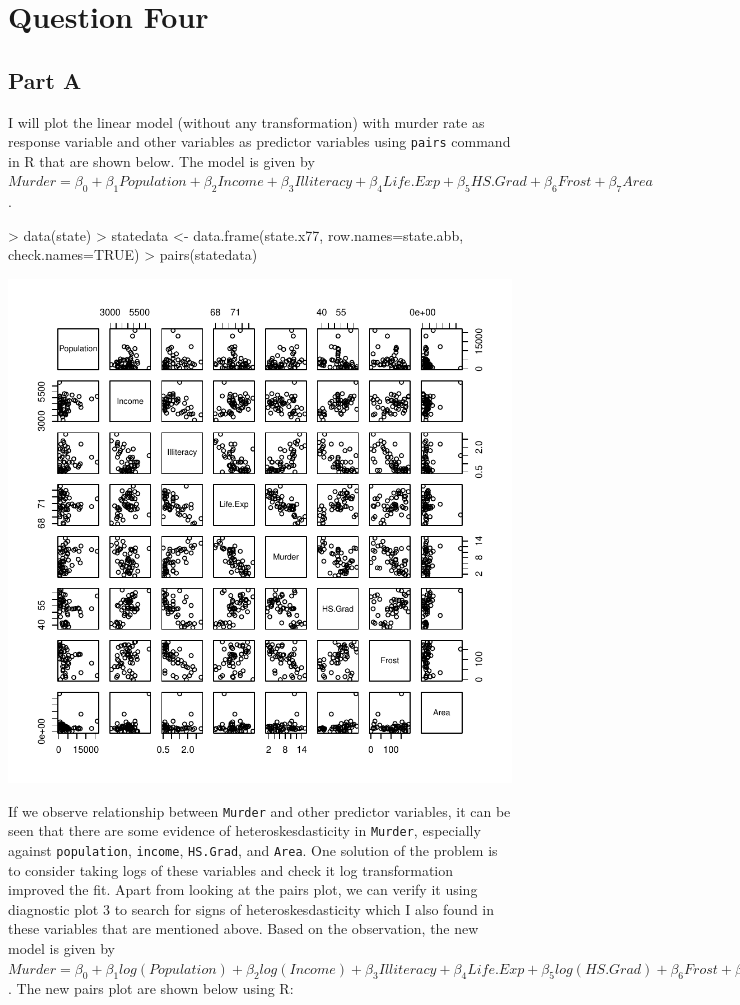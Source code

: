 \documentclass{article}
\begin{document}
\section{Question Four}
\subsection{Part A}
I will plot the linear model (without any transformation) with murder rate as response variable and other variables as predictor variables using \lstinline{pairs} command in R that are shown below. The model is given by $Murder = \beta_0 + \beta_1 Population + \beta_2 Income + \beta_3 Illiteracy + \beta_4 Life.Exp + \beta_5 HS.Grad + \beta_6 Frost + \beta_7 Area$.\\

\begin{Schunk}
\begin{Sinput}
> data(state)
> statedata <- data.frame(state.x77, row.names=state.abb, check.names=TRUE)
> pairs(statedata)
\end{Sinput}
\end{Schunk}
\includegraphics{Assignment2-007}

\noindent If we observe relationship between \lstinline{Murder} and other predictor variables, it can be seen that there are some evidence of heteroskesdasticity in \lstinline{Murder}, especially against \lstinline{population}, \lstinline{income}, \lstinline{HS.Grad}, and \lstinline{Area}. One solution of the problem is to consider taking logs of these variables and check it log transformation improved the fit. Apart from looking at the pairs plot, we can verify it using diagnostic plot 3 to search for signs of heteroskesdasticity which I also found in these variables that are mentioned above. Based on the observation, the new model is given by $Murder = \beta_0 + \beta_1 log(Population) + \beta_2 log(Income) + \beta_3 Illiteracy + \beta_4 Life.Exp + \beta_5 log(HS.Grad) + \beta_6 Frost + \beta_7 log(Area)$. The new pairs plot are shown below using R:
\end{document}
